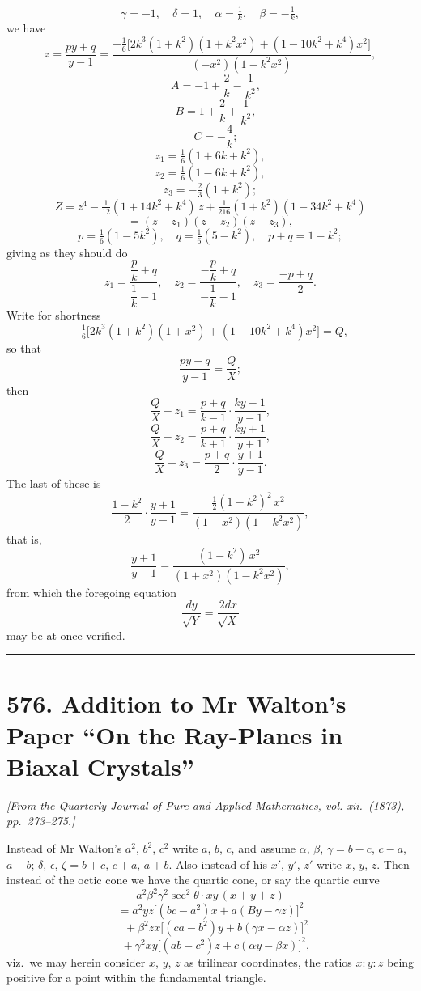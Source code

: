 \documentclass[11pt]{article}
\begin{document}
\[
\gamma = -1,\quad \delta = 1,\quad \alpha = \tfrac{1}{k},\quad \beta = -\tfrac{1}{k},
\]
we have
\[
z = \frac{py+q}{y-1} = \frac{-\tfrac{1}{6}\bigl[2k^{3}(1+k^{2})(1+k^{2}x^{2}) + (1-10k^{2}+k^{4})x^{2}\bigr]}{(-x^{2})(1-k^{2}x^{2})},
\]
\[
\quad A = -1 + \frac{2}{k} - \frac{1}{k^{2}},
\]
\[
\quad B = 1 + \frac{2}{k} + \frac{1}{k^{2}},
\]
\[
\quad C = -\frac{4}{k};
\]
\[
z_{1} = \tfrac{1}{6}(1 + 6k + k^{2}),
\]
\[
z_{2} = \tfrac{1}{6}(1 - 6k + k^{2}),
\]
\[
z_{3} = -\tfrac{2}{3}(1 + k^{2});
\]
\[
Z = z^{4} - \tfrac{1}{12}(1 + 14k^{2} + k^{4})\,z + \tfrac{1}{216}(1 + k^{2})(1 - 34k^{2} + k^{4})
\]
\[
= (z - z_{1})(z - z_{2})(z - z_{3}),
\]
\[
p = \tfrac{1}{6}(1 - 5k^{2}),\quad q = \tfrac{1}{6}(5 - k^{2}),\quad p + q = 1 - k^{2};
\]
giving as they should do
\[
z_{1} = \frac{\dfrac{p}{k}+q}{\dfrac{1}{k}-1},\quad z_{2} = \frac{-\dfrac{p}{k}+q}{-\dfrac{1}{k}-1},\quad z_{3} = \frac{-p+q}{-2}.
\]
Write for shortness
\[
-\tfrac{1}{6}\bigl[2k^{3}(1+k^{2})(1+x^{2}) + (1-10k^{2}+k^{4})x^{2}\bigr] = Q,
\]
so that
\[
\frac{py+q}{y-1} = \frac{Q}{X};
\]
then
\[
\frac{Q}{X} - z_{1} = \frac{p+q}{k-1}\cdot\frac{ky-1}{y-1},
\]
\[
\frac{Q}{X} - z_{2} = \frac{p+q}{k+1}\cdot\frac{ky+1}{y+1},
\]
\[
\frac{Q}{X} - z_{3} = \frac{p+q}{2}\cdot\frac{y+1}{y-1}.
\]
The last of these is
\[
\frac{1-k^{2}}{2}\cdot\frac{y+1}{y-1} = \frac{\tfrac{1}{2}(1-k^{2})^{2}\,x^{2}}{(1-x^{2})(1-k^{2}x^{2})},
\]
that is,
\[
\frac{y+1}{y-1} = \frac{(1-k^{2})\,x^{2}}{(1+x^{2})(1-k^{2}x^{2})},
\]
from which the foregoing equation
\[
\frac{dy}{\sqrt{Y}} = \frac{2 dx}{\sqrt{X}}
\]
may be at once verified.

\bigskip
\hrule
\bigskip

\section*{576. Addition to Mr Walton's Paper ``On the Ray-Planes in Biaxal Crystals''}

\noindent\textit{[From the Quarterly Journal of Pure and Applied Mathematics, vol. xii.\ (1873), pp.\ 273--275.]}

\medskip

Instead of Mr Walton's $a^{2}$, $b^{2}$, $c^{2}$ write $a$, $b$, $c$, and assume $\alpha$, $\beta$, $\gamma = b - c$, $c - a$, $a - b$; $\delta$, $\epsilon$, $\zeta = b + c$, $c + a$, $a + b$. Also instead of his $x'$, $y'$, $z'$ write $x$, $y$, $z$. Then instead of the octic cone we have the quartic cone, or say the quartic curve
\[
a^{2}\beta^{2}\gamma^{2}\sec^{2}\theta\cdot xy\,(x + y + z)
\]
\[
= a^{2}yz\bigl[(bc - a^{2})x + a(B y - \gamma z)\bigr]^{2}
\]
\[
\quad + \beta^{2}zx\bigl[(ca - b^{2})y + b(\gamma x - \alpha z)\bigr]^{2}
\]
\[
\quad + \gamma^{2}xy\bigl[(ab - c^{2})z + c(\alpha y - \beta x)\bigr]^{2},
\]
viz.\ we may herein consider $x$, $y$, $z$ as trilinear coordinates, the ratios $x:y:z$ being positive for a point within the fundamental triangle.
\end{document}
